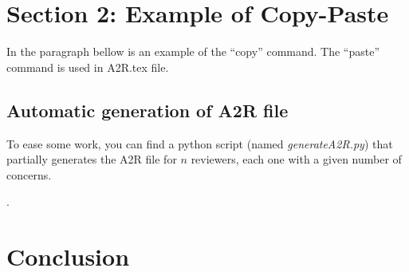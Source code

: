 \documentclass[./IEEE_Journal.tex]{subfiles}
\begin{document}
\section{Section 2: Example of Copy-Paste}\label{sec:Sec2}
In the paragraph bellow is an example of the ``copy'' command. The ``paste'' command is used in A2R.tex file.

\subsection{Automatic generation of A2R file}
To ease some work, \href{https://github.com/EstebanJGC/Latex_Templates_Macros.git}{}  you can find a python script (named \textit{generateA2R.py}) that partially generates the A2R file for $n$ reviewers, each one with a given number of concerns. 

\lipsum[50].


 
\section{Conclusion}\label{sec:conclusion} 
\end{document}

